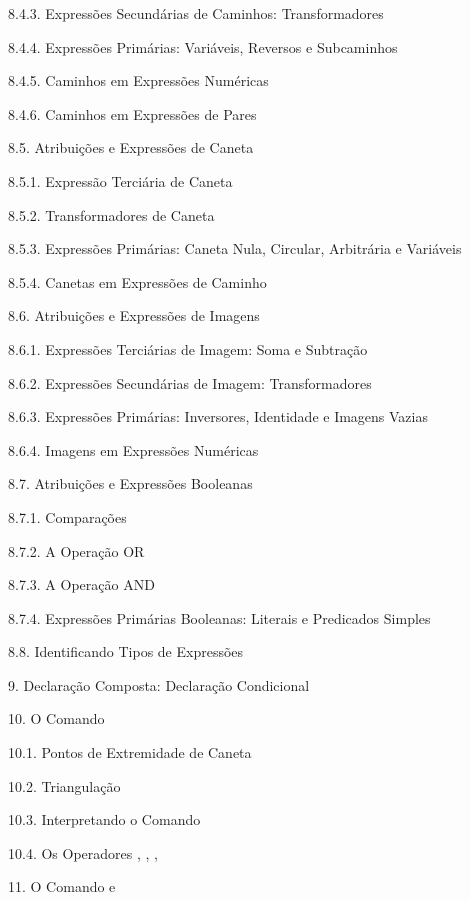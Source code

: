 8.4.3. Expressões Secundárias de Caminhos: Transformadores 

8.4.4. Expressões Primárias: Variáveis, Reversos e Subcaminhos 

8.4.5. Caminhos em Expressões Numéricas 

8.4.6. Caminhos em Expressões de Pares 

8.5. Atribuições e Expressões de Caneta 

8.5.1. Expressão Terciária de Caneta 

8.5.2. Transformadores de Caneta 

8.5.3. Expressões Primárias: Caneta Nula, Circular,
Arbitrária e Variáveis 

8.5.4. Canetas em Expressões de Caminho 

8.6. Atribuições e Expressões de Imagens 

8.6.1. Expressões Terciárias de Imagem: Soma e Subtração 

8.6.2. Expressões Secundárias de Imagem: Transformadores 

8.6.3. Expressões Primárias: Inversores, Identidade e
Imagens Vazias 

8.6.4. Imagens em Expressões Numéricas 

8.7. Atribuições e Expressões Booleanas 

8.7.1. Comparações 

8.7.2. A Operação OR 

8.7.3. A Operação AND 

8.7.4. Expressões Primárias Booleanas: Literais e Predicados Simples 

8.8. Identificando Tipos de Expressões 

9. Declaração Composta: Declaração Condicional 

10. O Comando  

10.1. Pontos de Extremidade de Caneta 

10.2. Triangulação 

10.3. Interpretando o Comando  

10.4. Os Operadores , , ,
 

11. O Comando  e  

